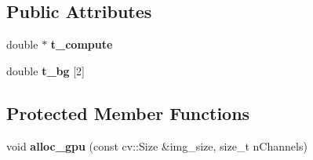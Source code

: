 \subsection*{Public Attributes}
\begin{DoxyCompactItemize}
\item 
\hypertarget{classskl_1_1gpu_1_1_tex_cut_a720ccfa1a20523b6a8dd69dc55031d78}{}\label{classskl_1_1gpu_1_1_tex_cut_a720ccfa1a20523b6a8dd69dc55031d78} 
double $\ast$ {\bfseries t\+\_\+compute}
\item 
\hypertarget{classskl_1_1gpu_1_1_tex_cut_a6036f029093059ef33580ec3696d3498}{}\label{classskl_1_1gpu_1_1_tex_cut_a6036f029093059ef33580ec3696d3498} 
double {\bfseries t\+\_\+bg} \mbox{[}2\mbox{]}
\end{DoxyCompactItemize}
\subsection*{Protected Member Functions}
\begin{DoxyCompactItemize}
\item 
\hypertarget{classskl_1_1gpu_1_1_tex_cut_a84f0be67cf31aed4b3e885607314a330}{}\label{classskl_1_1gpu_1_1_tex_cut_a84f0be67cf31aed4b3e885607314a330} 
void {\bfseries alloc\+\_\+gpu} (const cv\+::\+Size \&img\+\_\+size, size\+\_\+t n\+Channels)
\end{DoxyCompactItemize}
